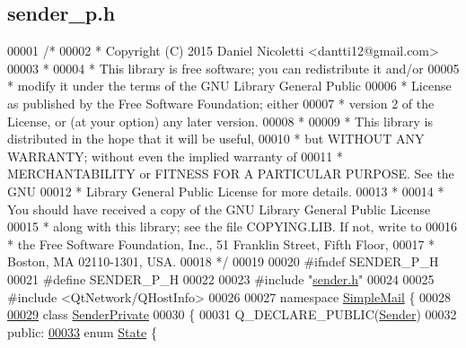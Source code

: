 \hypertarget{sender__p_8h_source}{}\subsection{sender\+\_\+p.\+h}
\label{sender__p_8h_source}

\begin{DoxyCode}
00001 \textcolor{comment}{/*}
00002 \textcolor{comment}{ * Copyright (C) 2015 Daniel Nicoletti <dantti12@gmail.com>}
00003 \textcolor{comment}{ *}
00004 \textcolor{comment}{ * This library is free software; you can redistribute it and/or}
00005 \textcolor{comment}{ * modify it under the terms of the GNU Library General Public}
00006 \textcolor{comment}{ * License as published by the Free Software Foundation; either}
00007 \textcolor{comment}{ * version 2 of the License, or (at your option) any later version.}
00008 \textcolor{comment}{ *}
00009 \textcolor{comment}{ * This library is distributed in the hope that it will be useful,}
00010 \textcolor{comment}{ * but WITHOUT ANY WARRANTY; without even the implied warranty of}
00011 \textcolor{comment}{ *  MERCHANTABILITY or FITNESS FOR A PARTICULAR PURPOSE. See the GNU}
00012 \textcolor{comment}{ * Library General Public License for more details.}
00013 \textcolor{comment}{ *}
00014 \textcolor{comment}{ * You should have received a copy of the GNU Library General Public License}
00015 \textcolor{comment}{ * along with this library; see the file COPYING.LIB. If not, write to}
00016 \textcolor{comment}{ * the Free Software Foundation, Inc., 51 Franklin Street, Fifth Floor,}
00017 \textcolor{comment}{ * Boston, MA 02110-1301, USA.}
00018 \textcolor{comment}{ */}
00019 
00020 \textcolor{preprocessor}{#ifndef SENDER\_P\_H}
00021 \textcolor{preprocessor}{#define SENDER\_P\_H}
00022 
00023 \textcolor{preprocessor}{#include "\hyperlink{sender_8h}{sender.h}"}
00024 
00025 \textcolor{preprocessor}{#include <QtNetwork/QHostInfo>}
00026 
00027 \textcolor{keyword}{namespace }\hyperlink{namespace_simple_mail}{SimpleMail} \{
00028 
\hyperlink{class_simple_mail_1_1_sender_private}{00029} \textcolor{keyword}{class }\hyperlink{class_simple_mail_1_1_sender_private}{SenderPrivate}
00030 \{
00031     Q\_DECLARE\_PUBLIC(\hyperlink{class_simple_mail_1_1_sender}{Sender})
00032 \textcolor{keyword}{public}:
\hyperlink{class_simple_mail_1_1_sender_private_ae09befddf0fae8e8f2ea153ead2b8b0a}{00033}     \textcolor{keyword}{enum} \hyperlink{class_simple_mail_1_1_sender_private_ae09befddf0fae8e8f2ea153ead2b8b0a}{State} \{

\end{DoxyCode}
